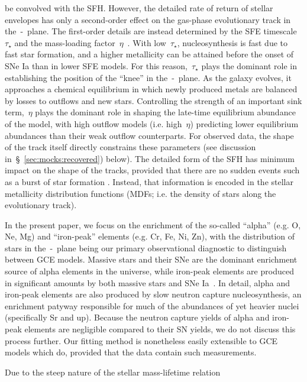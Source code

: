 \documentclass[ms.tex]{subfiles}
\begin{document}
be convolved with the SFH.
However, the detailed rate of return of stellar envelopes has only a
second-order effect on the gas-phase evolutionary track in the~\afe-\feh~plane.
The first-order details are instead determined by the SFE timescale~$\tau_\star$
and the mass-loading factor~$\eta$~\citep{Weinberg2017}.
With low~$\tau_\star$, nucleosynthesis is fast due to fast star formation, and
a higher metallicity can be attained before the onset of SNe Ia than in lower
SFE models.
For this reason,~$\tau_\star$ plays the dominant role in establishing the
position of the ``knee'' in the~\afe-\feh~plane.
As the galaxy evolves, it approaches a chemical equilibrium in which newly
produced metals are balanced by losses to outflows and new stars.
Controlling the strength of an important sink term,~$\eta$ plays the dominant
role in shaping the late-time equilibrium abundance of the model, with high
outflow models (i.e. high~$\eta$) predicting lower equilibrium abundances
than their weak outflow counterparts.
For observed data, the shape of the track itself directly constrains these
parameters (see discussion in~\S~\ref{sec:mocks:recovered}) below).
The detailed form of the SFH has minimum impact on the shape of the tracks,
provided that there are no sudden events such as a burst of star formation
\citep{Weinberg2017, Johnson2020}.
Instead, that information is encoded in the stellar metallicity distribution
functions (MDFs; i.e. the density of stars along the evolutionary track).
\par
In the present paper, we focus on the enrichment of the so-called ``alpha''
(e.g. O, Ne, Mg) and ``iron-peak'' elements (e.g. Cr, Fe, Ni, Zn), with the
distribution of stars in the~\afe-\feh~plane being our primary observational
diagnostic to distinguish between GCE models.
Massive stars and their SNe are the dominant enrichment source of alpha
elements in the universe, while iron-peak elements are produced in significant
amounts by both massive stars and SNe Ia~\citep[e.g.][]{Johnson2019}.
In detail, alpha and iron-peak elements are also produced by slow neutron
capture nucleosynthesis, an enrichment patyway responsible for much of the
abundances of yet heavier nuclei (specifically Sr and up).
Because the neutron capture yields of alpha and iron-peak elements are
negligible compared to their SN yields, we do not discuss this process further.
Our fitting method is nonetheless easily extensible to GCE models which do,
provided that the data contain such measurements.
\par
Due to the steep nature of the stellar mass-lifetime relation
\end{document}
